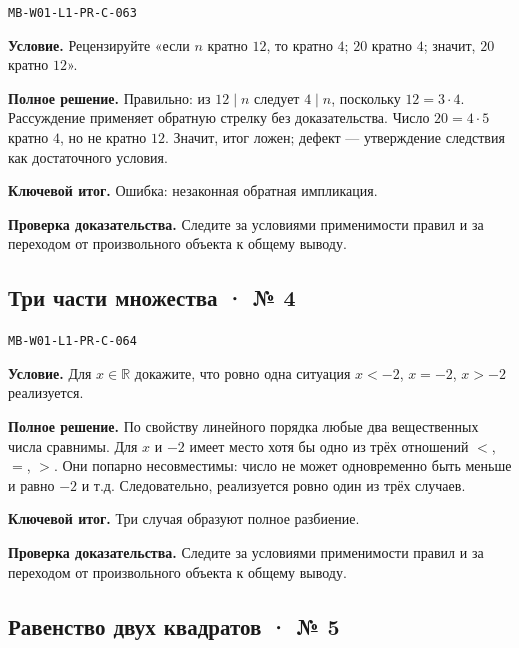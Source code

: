 \documentclass[11pt,a4paper,openany]{book}
\newcommand{\muid}[1]{\texttt{\footnotesize #1}}
\begin{document}
\muid{MB-W01-L1-PR-C-063}\par

\textbf{Условие.} Рецензируйте «если $n$ кратно $12$, то кратно $4$; $20$ кратно $4$; значит, $20$ кратно $12$».\par

\textbf{Полное решение.} Правильно: из $12\mid n$ следует $4\mid n$, поскольку $12=3\cdot4$. Рассуждение применяет обратную стрелку без доказательства. Число $20=4\cdot5$ кратно $4$, но не кратно $12$. Значит, итог ложен; дефект — утверждение следствия как достаточного условия.


\begin{learnbox}\textbf{Ключевой итог.} Ошибка: незаконная обратная импликация.\par \textbf{Проверка доказательства.} 
Следите за условиями применимости правил и за переходом от произвольного объекта к общему выводу. 
\end{learnbox}

\subsection*{Три части множества · № 4}\hypertarget{solution:MB-W01-L1-PR-C-064}{}

\muid{MB-W01-L1-PR-C-064}\par

\textbf{Условие.} Для $x\in\mathbb R$ докажите, что ровно одна ситуация $x<-2$, $x=-2$, $x>-2$ реализуется.\par

\textbf{Полное решение.} По свойству линейного порядка любые два вещественных числа сравнимы. Для $x$ и $-2$ имеет место хотя бы одно из трёх отношений $<$, $=$, $>$. Они попарно несовместимы: число не может одновременно быть меньше и равно $-2$ и т.д. Следовательно, реализуется ровно один из трёх случаев.


\begin{learnbox}\textbf{Ключевой итог.} Три случая образуют полное разбиение.\par \textbf{Проверка доказательства.} 
Следите за условиями применимости правил и за переходом от произвольного объекта к общему выводу. 
\end{learnbox}

\subsection*{Равенство двух квадратов · № 5}\hypertarget{solution:MB-W01-L1-PR-C-065}{}
\end{document}
